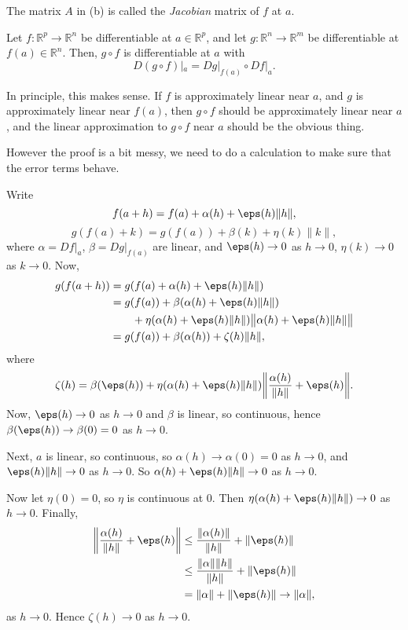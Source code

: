 \documentclass[12pt]{article}
\begin{document}
\begin{definition}
	The matrix $A$ in (b) is called the \textit{Jacobian} matrix of $f$ at $a$.
\end{definition}

\begin{theorem}
	Let $f : \mathbb{R}^{p} \to \mathbb{R}^{n}$ be differentiable at $a \in \mathbb{R}^{p}$, and let $g : \mathbb{R}^{n} \to \mathbb{R}^{m}$ be differentiable at $f(a) \in \mathbb{R}^{n}$. Then, $g \circ f$ is differentiable at $a$ with
	\[
	D(g \circ f)|_a = Dg|_{f(a)} \circ Df|_a
	.\]
\end{theorem}

\begin{remark}
	In principle, this makes sense.  If $f$ is approximately linear near $a$, and $g$ is approximately linear near $f(a)$, then $g \circ f$ should be approximately linear near $a$, and the linear approximation to $g \circ f$ near $a$ should be the obvious thing.

	However the proof is a bit messy, we need to do a calculation to make sure that the error terms behave.
\end{remark}

\begin{proofbox}
	Write
	\[
	f(a+h) = f(a) + \alpha(h) + \eps(h)\|h\|
	,\]
	\[
	g(f(a) + k) = g(f(a)) + \beta(k) + \eta(k)\|k\|
	,\]
	where $\alpha = Df|_a$, $\beta = Dg|_{f(a)}$ are linear, and $\eps(h) \to 0$ as $h \to 0$, $\eta(k) \to 0$ as $k \to 0$. Now,
	\begin{align*}
		g(f(a+h)) &= g(f(a) + \alpha(h) + \eps(h)\|h\|) \\
			  &= g(f(a)) + \beta(\alpha(h) + \eps(h)\|h\|) \\
			  &\qquad + \eta(\alpha(h)+\eps(h)\|h\|)\bigl\|\alpha(h)+\eps(h)\|h\|\bigr\| \\
			  &= g(f(a)) + \beta(\alpha(h)) + \zeta(h)\|h\|,
	\end{align*}
	where
	\[
	\zeta(h) = \beta(\eps(h)) + \eta(\alpha(h) + \eps(h)\|h\|) \biggl\| \frac{\alpha(h)}{\|h\|} + \eps(h) \biggr\|
	.\]
	Now, $\eps(h) \to 0$ as $h \to 0$ and $\beta$ is linear, so continuous, hence $\beta(\eps(h)) \to \beta(0) = 0$ as $h \to 0$.

	Next, $a$ is linear, so continuous, so $\alpha(h) \to \alpha(0) = 0$ as $h \to 0$, and $\eps(h) \|h\| \to 0$ as $h \to 0$. So $\alpha(h) + \eps(h) \|h\| \to 0$ as $h \to 0$.

	Now let $\eta(0) = 0$, so $\eta$ is continuous at $0$. Then $\eta(\alpha(h) + \eps(h)\|h\|) \to 0$ as $h \to 0$. Finally,
	\begin{align*}
		\biggl\| \frac{\alpha(h)}{\|h\|} + \eps(h) \biggr\| &\leq \frac{\|\alpha(h)\|}{\|h\|} + \|\eps(h)\| \\
								    &\leq \frac{\|\alpha\| \|h\|}{\|h\|} + \|\eps(h)\| \\
								    &= \|\alpha\| + \|\eps(h)\| \to \|\alpha\|,
	\end{align*}
	as $h \to 0$. Hence $\zeta(h) \to 0$ as $h \to 0$.
\end{proofbox}
\end{document}

